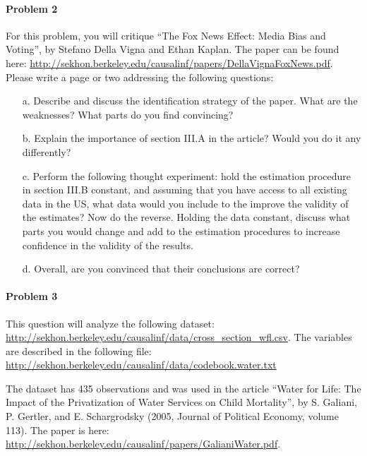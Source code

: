 \documentclass{article}
\begin{document}
\paragraph{Problem 2}

For this problem, you will critique ``The Fox News Effect: Media Bias
and Voting'', by Stefano Della Vigna and Ethan Kaplan. The paper can
be found here:
\url{http://sekhon.berkeley.edu/causalinf/papers/DellaVignaFoxNews.pdf}. Please
write a page or two addressing the following questions:

   \begin{itemize}
   \item[a.]  Describe and discuss the identification strategy of the
     paper. What are the weaknesses? What parts do you find
     convincing?
   \item[b.] Explain the importance of section III.A in the article?
     Would you do it any differently?
   \item[c.] Perform the following thought experiment: hold the
     estimation procedure in section III.B constant, and assuming that
     you have access to all existing data in the US, what data would
     you include to the improve the validity of the estimates? Now do
     the reverse. Holding the data constant, discuss what parts you
     would change and add to the estimation procedures to increase
     confidence in the validity of the results.
   \item[d.] Overall, are you convinced that their conclusions are
     correct?
\end{itemize}




\paragraph{Problem 3} 


This question will analyze the following dataset:
\url{http://sekhon.berkeley.edu/causalinf/data/cross_section_wfl.csv}.
The variables are described in the following file:
\url{http://sekhon.berkeley.edu/causalinf/data/codebook.water.txt}

\vspace{1em}
\noindent
The dataset has 435 observations and was used in the article ``Water
for Life: The Impact of the Privatization of Water Services on Child
Mortality'', by S. Galiani, P. Gertler, and E. Schargrodsky (2005,
Journal of Political Economy, volume 113).  The paper is here: \url{http://sekhon.berkeley.edu/causalinf/papers/GalianiWater.pdf}.
\end{document}
